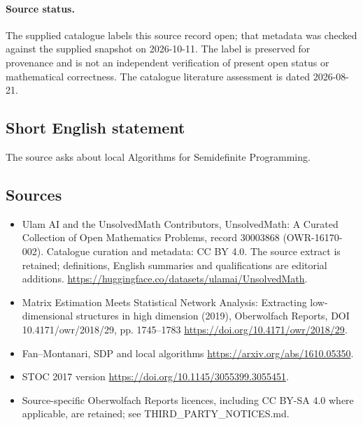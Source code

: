 \documentclass[11pt]{article}
\begin{document}
\paragraph{Source status.}
The supplied catalogue labels this source record open; that metadata was checked against the supplied snapshot on 2026-10-11. The label is preserved for provenance and is not an independent verification of present open status or mathematical correctness. The catalogue literature assessment is dated 2026-08-21.
\subsection{Short English statement}
The source asks about local Algorithms for Semidefinite Programming.
\subsection{Sources}
\begin{itemize}
\item[\hypertarget{source:30003868:1}{S1}] Ulam AI and the UnsolvedMath Contributors, UnsolvedMath: A Curated Collection of Open Mathematics Problems, record 30003868 (OWR-16170-002). Catalogue curation and metadata: CC BY 4.0. The source extract is retained; definitions, English summaries and qualifications are editorial additions.
\url{https://huggingface.co/datasets/ulamai/UnsolvedMath}.
\item[\hypertarget{source:30003868:2}{S2}] Matrix Estimation Meets Statistical Network Analysis: Extracting low-dimensional structures in high dimension (2019), Oberwolfach Reports, DOI 10.4171/owr/2018/29, pp. 1745--1783
\url{https://doi.org/10.4171/owr/2018/29}.
\item[\hypertarget{source:30003868:3}{S3}] Fan--Montanari, SDP and local algorithms
\url{https://arxiv.org/abs/1610.05350}.
\item[\hypertarget{source:30003868:4}{S4}] STOC 2017 version
\url{https://doi.org/10.1145/3055399.3055451}.
\item Source-specific Oberwolfach Reports licences, including CC BY-SA 4.0 where applicable, are retained; see THIRD\_PARTY\_NOTICES.md.
\end{itemize}
\end{document}
